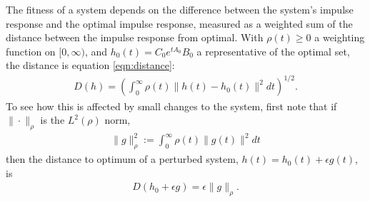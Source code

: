 \documentclass{article}
\newcommand{\1}{\mathbbm{1}}
\begin{document}
The fitness of a system 
depends on the difference between the system's impulse response and the optimal impulse response,
measured  as a weighted sum of
the distance between the impulse response from optimal.
With $\rho(t) \ge 0$ a weighting function on $[0,\infty)$,
and $h_0(t) = C_0 e^{tA_0} B_0$ a representative of the optimal set,
the distance is equation \eqref{eqn:distance}:
\begin{align}
	D(h) = \left( \int_0^\infty \rho(t) \|h(t) - h_0(t)\|^2 dt \right)^{1/2} .
\end{align}
To see how this is affected by small changes to the system,
first note that if $\|\cdot\|_\rho$ is the $L^2(\rho)$ norm,
\begin{align}
	\|g\|_\rho^2 := \int_0^\infty \rho(t) \|g(t)\|^2 dt
\end{align}
then the distance to optimum of a perturbed system, $h(t) = h_0(t) + \epsilon g(t)$, is
\begin{align}
	D(h_0 + \epsilon g) = \epsilon \|g\|_\rho .
\end{align}
\end{document}

